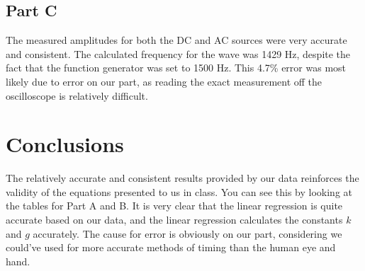 \documentclass[titlepage]{article}
\begin{document}
\subsection{Part C}\label{sub:part_c}
The measured amplitudes for both the DC and AC sources were very accurate and consistent. The calculated frequency for the wave was 1429 Hz, despite the fact that the function generator was set to 1500 Hz. This 4.7\% error was most likely due to error on our part, as reading the exact measurement off the oscilloscope is relatively difficult.

\section{Conclusions}\label{sec:conclusions}
The relatively accurate and consistent results provided by our data reinforces the validity of the equations presented to us in class. You can see this by looking at the tables for Part A and B. It is very clear that the linear regression is quite accurate based on our data, and the linear regression calculates the constants $k$ and $g$ accurately. The cause for error is obviously on our part, considering we could've used for more accurate methods of timing than the human eye and hand.
\end{document}
